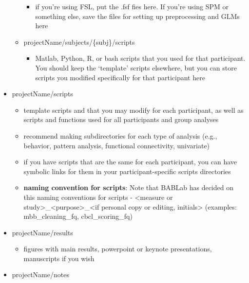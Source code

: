\documentclass[]{book}
\providecommand{\tightlist}{%
  \setlength{\itemsep}{0pt}\setlength{\parskip}{0pt}}
\begin{document}
\begin{itemize}
\begin{itemize}
    \begin{itemize}
    \tightlist
    \item
      if you're using FSL, put the .fsf fies here. If you're using SPM
      or something else, save the files for setting up preprocessing and
      GLMs here
    \end{itemize}
  \item
    projectName/subjects/\{subj\}/scripts

    \begin{itemize}
    \tightlist
    \item
      Matlab, Python, R, or bash scripts that you used for that
      participant. You should keep the `template' scripts elsewhere, but
      you can store scripts you modified specifically for that
      participant here
    \end{itemize}
  \end{itemize}
\item
  projectName/scripts

  \begin{itemize}
  \tightlist
  \item
    template scripts and that you may modify for each participant, as
    well as scripts and functions used for all participants and group
    analyses
  \item
    recommend making subdirectories for each type of analysis (e.g.,
    behavior, pattern analysis, functional connectivity, univariate)
  \item
    if you have scripts that are the same for each participant, you can
    have symbolic links for them in your participant-specific scripts
    directories
  \item
    \textbf{naming convention for scripts}: Note that BABLab has decided
    on this naming conventions for scripts - \textless{}measure or
    study\textgreater{}\_\textless{}purpose\textgreater{}\_\textless{}if
    personal copy or editing, initials\textgreater{} (examples:
    mbb\_cleaning\_fq, cbcl\_scoring\_fq)
  \end{itemize}
\item
  projectName/results

  \begin{itemize}
  \tightlist
  \item
    figures with main results, powerpoint or keynote presentations,
    manuscripts if you wish
  \end{itemize}
\item
  projectName/notes


\end{itemize}
\end{document}
